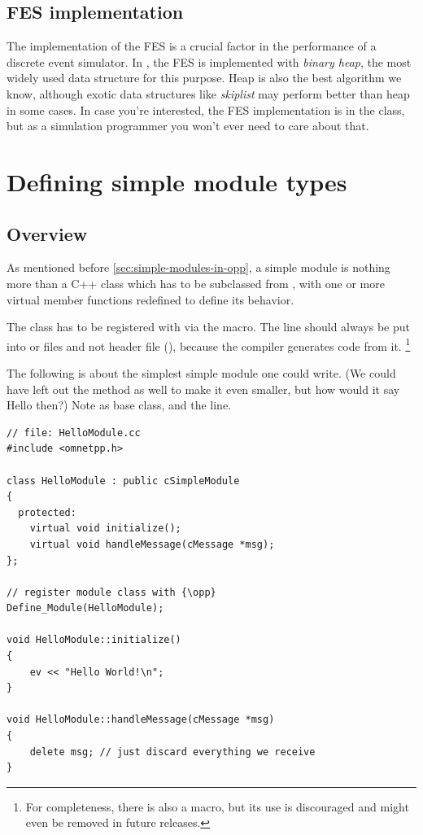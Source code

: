 \subsection{FES implementation}
\label{sec:simple-modules:fes-implementation}

The implementation of the FES is a crucial factor in the
performance of a discrete event simulator. In {\opp}, the FES is
implemented with \textit{binary heap}, the most
widely used data structure for this purpose. Heap is also the best
algorithm we know, although exotic data structures like
\textit{skiplist} may perform better than heap in some
cases. In case you're interested, the FES implementation is in the
 class, but as a simulation programmer you won't
ever need to care about that.





\section{Defining simple module types}
\label{sec:simple-modules:defining-simple-modules}

\subsection{Overview}

As mentioned before \ref{sec:simple-modules-in-opp}, a simple module
is nothing more than a C++ class which has to be subclassed from
, with one or more virtual member functions redefined
to define its behavior.

The class has to be registered with {\opp} via the  macro.
The  line should always be put into  or 
files and not header file (), because the compiler generates code from it.
      \footnote{For completeness, there is also a 
                macro, but its use is discouraged and might even be removed in
                future {\opp} releases.}

The following  is about the simplest simple module one could write.
(We could have left out the  method as well to make it even smaller,
but how would it say Hello then?) Note  as base class,
and the  line.

\begin{verbatim}
// file: HelloModule.cc
#include <omnetpp.h>

class HelloModule : public cSimpleModule
{
  protected:
    virtual void initialize();
    virtual void handleMessage(cMessage *msg);
};

// register module class with {\opp}
Define_Module(HelloModule);

void HelloModule::initialize()
{
    ev << "Hello World!\n";
}

void HelloModule::handleMessage(cMessage *msg)
{
    delete msg; // just discard everything we receive
}
\end{verbatim}

